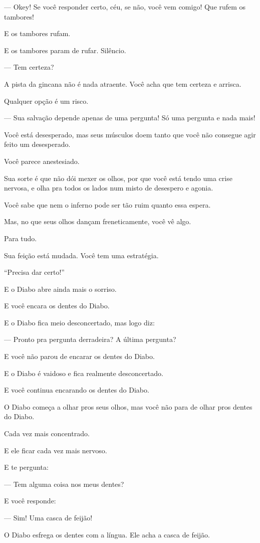 --- Okey! Se você responder certo, céu, se não, você vem comigo! Que rufem os tambores!

E os tambores rufam.

E os tambores param de rufar. Silêncio.

--- Tem certeza?

A pista da gincana não é nada atraente. Você acha que tem certeza e arrisca.

Qualquer opção é um risco.

--- Sua salvação depende apenas de uma pergunta! Só uma pergunta e nada mais!

Você está desesperado, mas seus músculos doem tanto que você não consegue agir feito um desesperado.

Você parece anestesiado.

Sua sorte é que não dói mexer os olhos, por que você está tendo uma crise nervosa, e olha pra todos os lados num misto de desespero e agonia.

Você sabe que nem o inferno pode ser tão ruim quanto essa espera.

Mas, no que seus olhos dançam freneticamente, você vê algo.

Para tudo.

Sua feição está mudada. Você tem uma estratégia.

``Precisa dar certo!''

E o Diabo abre ainda mais o sorriso.

E você encara os dentes do Diabo.

E o Diabo fica meio desconcertado, mas logo diz:

--- Pronto pra pergunta derradeira? A última pergunta?

E você não parou de encarar os dentes do Diabo.

E o Diabo é vaidoso e fica realmente desconcertado.

E você continua encarando os dentes do Diabo.

O Diabo começa a olhar pros seus olhos, mas você não para de olhar pros dentes do Diabo.

Cada vez mais concentrado.

E ele ficar cada vez mais nervoso.

E te pergunta:

--- Tem alguma coisa nos meus dentes?

E você responde:

--- Sim! Uma casca de feijão!

O Diabo esfrega os dentes com a língua. Ele acha a casca de feijão.

